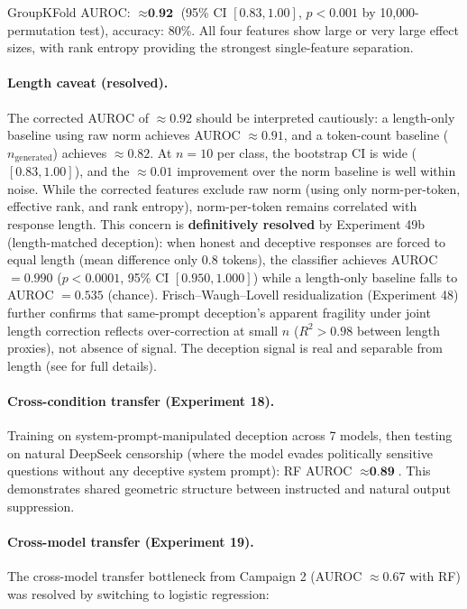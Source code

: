 GroupKFold AUROC: $\approx \textbf{0.92}$ (95\% CI $[0.83, 1.00]$, $p < 0.001$ by 10{,}000-permutation test), accuracy: 80\%. All four features show large or very large effect sizes, with rank entropy providing the strongest single-feature separation.

\paragraph{Length caveat (resolved).} The corrected AUROC of $\approx 0.92$ should be interpreted cautiously: a length-only baseline using raw norm achieves AUROC $\approx 0.91$, and a token-count baseline ($n_{\text{generated}}$) achieves $\approx 0.82$. At $n = 10$ per class, the bootstrap CI is wide ($[0.83, 1.00]$), and the $\approx 0.01$ improvement over the norm baseline is well within noise. While the corrected features exclude raw norm (using only norm-per-token, effective rank, and rank entropy), norm-per-token remains correlated with response length. This concern is \textbf{definitively resolved} by Experiment 49b (length-matched deception): when honest and deceptive responses are forced to equal length (mean difference only 0.8 tokens), the classifier achieves AUROC $= 0.990$ ($p < 0.0001$, 95\% CI $[0.950, 1.000]$) while a length-only baseline falls to AUROC $= 0.535$ (chance). Frisch--Waugh--Lovell residualization (Experiment 48) further confirms that same-prompt deception's apparent fragility under joint length correction reflects over-correction at small $n$ ($R^{2} > 0.98$ between length proxies), not absence of signal. The deception signal is real and separable from length (see  for full details).

\paragraph{Cross-condition transfer (Experiment 18).} Training on system-prompt-manipulated deception across 7 models, then testing on natural DeepSeek censorship (where the model evades politically sensitive questions without any deceptive system prompt): RF AUROC $\approx \textbf{0.89}$. This demonstrates shared geometric structure between instructed and natural output suppression.

\paragraph{Cross-model transfer (Experiment 19).} The cross-model transfer bottleneck from Campaign 2 (AUROC $\approx 0.67$ with RF) was resolved by switching to logistic regression:

